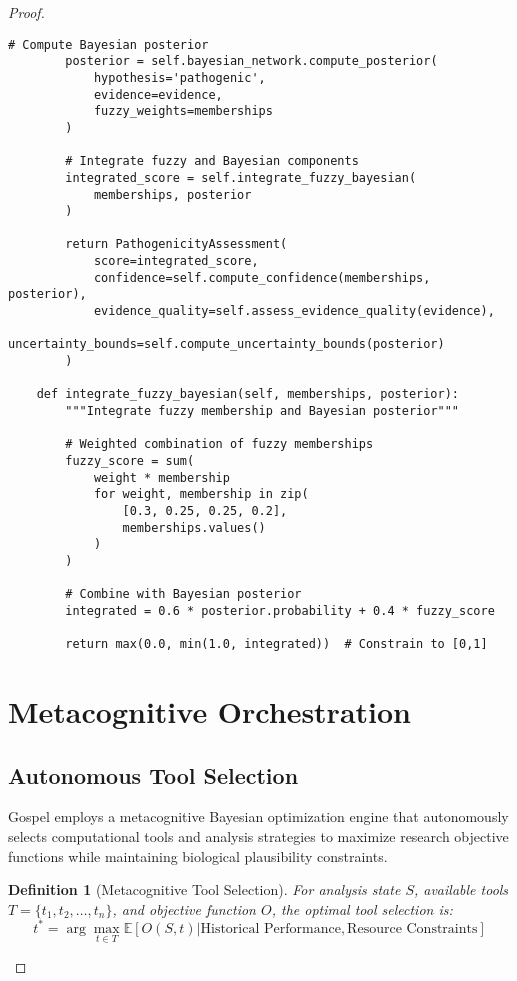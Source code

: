 \documentclass[12pt,a4paper]{article}
\newtheorem{definition}[theorem]{Definition}
\begin{document}
\begin{proof}
\begin{lstlisting}[style=pythonstyle, caption=Fuzzy-Bayesian Network Implementation]
        # Compute Bayesian posterior
        posterior = self.bayesian_network.compute_posterior(
            hypothesis='pathogenic',
            evidence=evidence,
            fuzzy_weights=memberships
        )
        
        # Integrate fuzzy and Bayesian components
        integrated_score = self.integrate_fuzzy_bayesian(
            memberships, posterior
        )
        
        return PathogenicityAssessment(
            score=integrated_score,
            confidence=self.compute_confidence(memberships, posterior),
            evidence_quality=self.assess_evidence_quality(evidence),
            uncertainty_bounds=self.compute_uncertainty_bounds(posterior)
        )
        
    def integrate_fuzzy_bayesian(self, memberships, posterior):
        """Integrate fuzzy membership and Bayesian posterior"""
        
        # Weighted combination of fuzzy memberships
        fuzzy_score = sum(
            weight * membership 
            for weight, membership in zip(
                [0.3, 0.25, 0.25, 0.2], 
                memberships.values()
            )
        )
        
        # Combine with Bayesian posterior
        integrated = 0.6 * posterior.probability + 0.4 * fuzzy_score
        
        return max(0.0, min(1.0, integrated))  # Constrain to [0,1]
\end{lstlisting}

\section{Metacognitive Orchestration}

\subsection{Autonomous Tool Selection}

Gospel employs a metacognitive Bayesian optimization engine that autonomously selects computational tools and analysis strategies to maximize research objective functions while maintaining biological plausibility constraints.

\begin{definition}[Metacognitive Tool Selection]
For analysis state $S$, available tools $T = \{t_1, t_2, \ldots, t_n\}$, and objective function $O$, the optimal tool selection is:
\begin{equation}
t^* = \arg\max_{t \in T} \mathbb{E}[O(S, t) | \text{Historical Performance}, \text{Resource Constraints}]
\end{equation}
\end{definition}


\end{proof}
\end{document}
